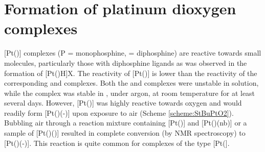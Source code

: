  
\section{Formation of platinum dioxygen complexes}
\label{section:PtO2}

[Pt()] complexes (P = monophosphine,  = diphosphine) are reactive towards small molecules, particularly those with diphosphine ligands as was observed in the formation of [Pt(\tBuxantphos)H]X.\cite{Hackett1988} The reactivity of [Pt(\tButhixantphos)] is lower than the reactivity of the corresponding \tBusixantphos{} and \tBuxantphos{} complexes.  Both the \tBusixantphos{} and \tBuxantphos{} complexes were unstable in solution, while the \tButhixantphos{} complex was stable in , under argon, at room temperature for at least several days.  However, [Pt(\tButhixantphos)] was highly reactive towards oxygen and would readily form [Pt(\tButhixantphos)(-)] upon exposure to air (Scheme \ref{scheme:StBuPtO2}).  Bubbling air through a reaction mixture containing [Pt(\tButhixantphos)] and [Pt(\tButhixantphos)(nb)] or a sample of [Pt(\tButhixantphos)()] resulted in complete conversion (by \phosphorus{} NMR spectroscopy) to [Pt(\tButhixantphos)(-)].  This reaction is quite common for complexes of the type [Pt(].\cite{Goel1983b, Yoshida1977}

